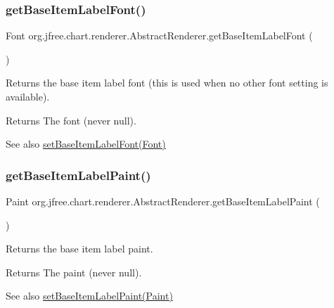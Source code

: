 \subsubsection{\texorpdfstring{get\+Base\+Item\+Label\+Font()}{getBaseItemLabelFont()}}
{\footnotesize\ttfamily Font org.\+jfree.\+chart.\+renderer.\+Abstract\+Renderer.\+get\+Base\+Item\+Label\+Font (\begin{DoxyParamCaption}{ }\end{DoxyParamCaption})}

Returns the base item label font (this is used when no other font setting is available).

\begin{DoxyReturn}{Returns}
The font ({\ttfamily never} null).
\end{DoxyReturn}
\begin{DoxySeeAlso}{See also}
\mbox{\hyperlink{classorg_1_1jfree_1_1chart_1_1renderer_1_1_abstract_renderer_aced8e1ceab30b0c47a3397fc92a513e5}{set\+Base\+Item\+Label\+Font(\+Font)}} 
\end{DoxySeeAlso}
\mbox{\label{classorg_1_1jfree_1_1chart_1_1renderer_1_1_abstract_renderer_a553eba1baf9f5d241c06a77c80a223d6}} 
\subsubsection{\texorpdfstring{get\+Base\+Item\+Label\+Paint()}{getBaseItemLabelPaint()}}
{\footnotesize\ttfamily Paint org.\+jfree.\+chart.\+renderer.\+Abstract\+Renderer.\+get\+Base\+Item\+Label\+Paint (\begin{DoxyParamCaption}{ }\end{DoxyParamCaption})}

Returns the base item label paint.

\begin{DoxyReturn}{Returns}
The paint (never {\ttfamily null}).
\end{DoxyReturn}
\begin{DoxySeeAlso}{See also}
\mbox{\hyperlink{classorg_1_1jfree_1_1chart_1_1renderer_1_1_abstract_renderer_a7f9efd901126d27a6f785a53e6872e04}{set\+Base\+Item\+Label\+Paint(\+Paint)}} 
\end{DoxySeeAlso}
\mbox{\label{classorg_1_1jfree_1_1chart_1_1renderer_1_1_abstract_renderer_a360a67714905022c4373c33ad83626b8}} 
